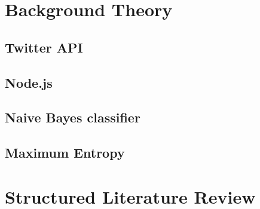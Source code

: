 \section{Background Theory}

	\subsection{Twitter API}
	
	
	\subsection{Node.js}
		
	
	\subsection{Naive Bayes classifier}
	
	
	\subsection{Maximum Entropy}
	

\section{Structured Literature Review}
